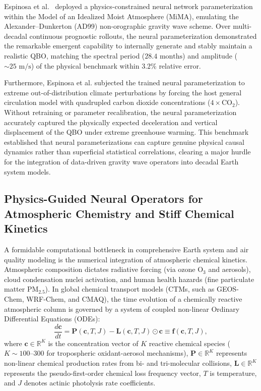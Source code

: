 Espinosa et al.~\cite{espinosa2022gravity} deployed a physics-constrained neural network parameterization within the Model of an Idealized Moist Atmosphere (MiMA), emulating the Alexander--Dunkerton (AD99) non-orographic gravity wave scheme. Over multi-decadal continuous prognostic rollouts, the neural parameterization demonstrated the remarkable emergent capability to internally generate and stably maintain a realistic QBO, matching the spectral period ($28.4\text{ months}$) and amplitude ($\sim 25\text{ m/s}$) of the physical benchmark within $3.2\%$ relative error. 

Furthermore, Espinosa et al. subjected the trained neural parameterization to extreme out-of-distribution climate perturbations by forcing the host general circulation model with quadrupled carbon dioxide concentrations ($4\times \text{CO}_2$). Without retraining or parameter recalibration, the neural parameterization accurately captured the physically expected deceleration and vertical displacement of the QBO under extreme greenhouse warming. This benchmark established that neural parameterizations can capture genuine physical causal dynamics rather than superficial statistical correlations, clearing a major hurdle for the integration of data-driven gravity wave operators into decadal Earth system models.

\subsection{Physics-Guided Neural Operators for Atmospheric Chemistry and Stiff Chemical Kinetics}
\label{sec:atmospheric_chemistry_kinetics}

A formidable computational bottleneck in comprehensive Earth system and air quality modeling is the numerical integration of atmospheric chemical kinetics. Atmospheric composition dictates radiative forcing (via ozone $\text{O}_3$ and aerosols), cloud condensation nuclei activation, and human health hazards (fine particulate matter $\text{PM}_{2.5}$). In global chemical transport models (CTMs, such as GEOS-Chem, WRF-Chem, and CMAQ), the time evolution of a chemically reactive atmospheric column is governed by a system of coupled non-linear Ordinary Differential Equations (ODEs):
\begin{equation}
    \frac{d\mathbf{c}}{dt} = \mathbf{P}(\mathbf{c}, T, J) - \mathbf{L}(\mathbf{c}, T, J) \odot \mathbf{c} \equiv \mathbf{f}(\mathbf{c}, T, J),
    \label{eq:chemical_ode}
\end{equation}
where $\mathbf{c} \in \mathbb{R}^K$ is the concentration vector of $K$ reactive chemical species ($K \sim 100\text{--}300$ for tropospheric oxidant-aerosol mechanisms), $\mathbf{P} \in \mathbb{R}^K$ represents non-linear chemical production rates from bi- and tri-molecular collisions, $\mathbf{L} \in \mathbb{R}^K$ represents the pseudo-first-order chemical loss frequency vector, $T$ is temperature, and $J$ denotes actinic photolysis rate coefficients.

